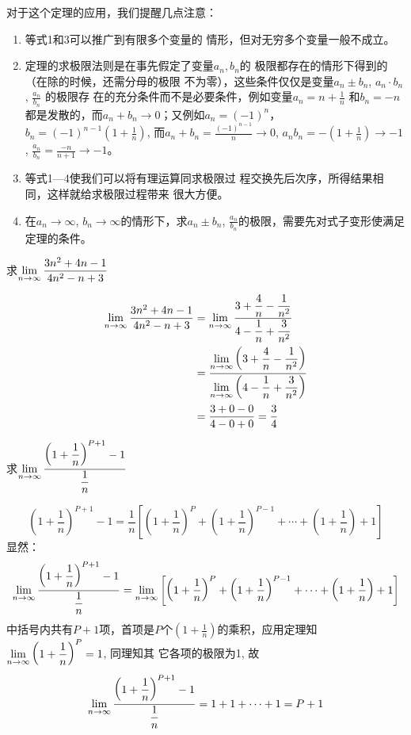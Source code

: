 对于这个定理的应用，我们提醒几点注意：
\begin{enumerate}
    \item 等式1和3可以推广到有限多个变量的
情形，但对无穷多个变量一般不成立。
\item 定理的求极限法则是在事先假定了变量$a_n,b_n$的
极限都存在的情形下得到的（在除的时候，还需分母的极限
不为零），这些条件仅仅是变量$a_n\pm b_n$, $a_n\cdot b_n$, $\frac{a_n}{b_n}$
的极限存
在的充分条件而不是必要条件，例如变量$a_n=n+\frac{1}{n}$
和$b_n=-n$都是发散的，而$a_n+b_n\to 0$；又例如$a_n=(-1)^n$，
$b_n=(-1)^{n-1}\left(1+\frac{1}{n}\right)$, 
而$a_n+b_n=\frac{(-1)^{n-1}}{n}\to 0$, $a_nb_n=-\left(1+\frac{1}{n}\right)\to -1$, $\frac{a_n}{b_n}=\frac{-n}{n+1}\to -1$。
\item 等式1---4使我们可以将有理运算同求极限过
程交换先后次序，所得结果相同，这样就给求极限过程带来
很大方便。
\item 在$a_n\to\infty$, $b_n\to\infty$的情形下，求$a_n\pm b_n$, $\frac{a_n}{b_n}$的极限，需要先对式子变形使满足定理的条件。
\end{enumerate}


\begin{example}
    求$\displaystyle\lim_{n\to\infty}\dfrac{3n^2+4n-1}{4n^2-n+3}$
\end{example}

\begin{solution}
\[\begin{split}
    \displaystyle\lim_{n\to\infty}\dfrac{3n^2+4n-1}{4n^2-n+3}&=\displaystyle\lim_{n\to\infty}\dfrac{3+\dfrac{4}{n}-\dfrac{1}{n^2}}{4-\dfrac{1}{n}+\dfrac{3}{n^2}}\\
    &=\dfrac{\displaystyle\lim_{n\to\infty}\left(3+\dfrac{4}{n}-\dfrac{1}{n^2}\right)}{\displaystyle\lim_{n\to\infty}\left(4-\dfrac{1}{n}+\dfrac{3}{n^2}\right)}\\
    &=\dfrac{3+0-0}{4-0+0}=\dfrac{3}{4}
\end{split}\]    
\end{solution}

\begin{example}
求$\displaystyle\lim_{n\to\infty}\dfrac{\left(1+\dfrac{1}{n}\right)^{P+1}-1}{\dfrac{1}{n}}$  
\end{example}

\begin{solution}
\[\left(1+\frac{1}{n}\right)^{P+1}-1=\frac{1}{n}\left[\left(1+\frac{1}{n}\right)^{P}+\left(1+\frac{1}{n}\right)^{P-1}+\cdots+\left(1+\frac{1}{n}\right)+1\right]\]
    显然：
\[    \displaystyle\lim_{n\to\infty}\dfrac{\left(1+\dfrac{1}{n}\right)^{P+1}-1}{\dfrac{1}{n}}=\displaystyle\lim_{n\to\infty}\left[\left(1+\dfrac{1}{n}\right)^{P}+\left(1+\dfrac{1}{n}\right)^{P-1}+\cdots+\left(1+\dfrac{1}{n}\right)+1\right]
\]
中括号内共有$P+1$项，首项是$P$个$\left(1+\frac{1}{n}\right)$的乘积，应用定理知$\displaystyle\lim_{n\to\infty} \left(1+\dfrac{1}{n}\right)^{P}=1$, 同理知其
它各项的极限为1, 故
\[    \displaystyle\lim_{n\to\infty}\dfrac{\left(1+\dfrac{1}{n}\right)^{P+1}-1}{\dfrac{1}{n}}=1+1+\cdots+1=P+1
\]
\end{solution}


